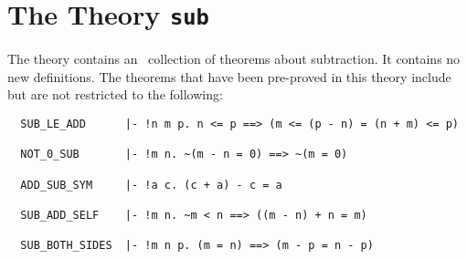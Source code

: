 \section{The Theory {\tt sub}}

The theory  contains an
\adhoc\ collection of 
theorems about subtraction. It contains no new definitions.
The theorems that have been pre-proved in this theory include but are not
restricted to the following:
\begin{hol}
\begin{verbatim}
  SUB_LE_ADD      |- !n m p. n <= p ==> (m <= (p - n) = (n + m) <= p)

  NOT_0_SUB       |- !m n. ~(m - n = 0) ==> ~(m = 0)

  ADD_SUB_SYM     |- !a c. (c + a) - c = a

  SUB_ADD_SELF    |- !m n. ~m < n ==> ((m - n) + n = m)

  SUB_BOTH_SIDES  |- !m n p. (m = n) ==> (m - p = n - p)
\end{verbatim}\end{hol}
